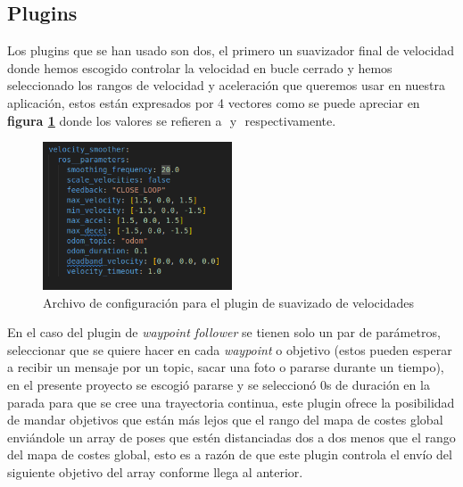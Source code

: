 \subsection{Plugins}
Los plugins que se han usado son dos, el primero un suavizador final de velocidad donde hemos escogido controlar la velocidad en bucle cerrado y 
hemos seleccionado los rangos de velocidad y aceleración que queremos usar en nuestra aplicación, estos están expresados por 4 vectores como se 
puede apreciar en \textbf{figura \ref{fig:suavizado_vel}} donde los valores se refieren a \begin{math}[\dot{X},\dot{Y},\dot{\theta_{z}}]\end{math} 
 y \begin{math}[\ddot{X}, \ddot{Y}, \ddot{\theta_{z}}] \end{math} respectivamente.

\begin{figure}[H]
    \centering
    \includegraphics[width=0.5\textwidth]{images/velocity_smoother_params.png}
    \caption{Archivo de configuración para el plugin de suavizado de velocidades}
    \label{fig:suavizado_vel}
\end{figure}

En el caso del plugin de \textit{waypoint follower} se tienen solo un par de parámetros, seleccionar que se quiere hacer en cada \textit{waypoint} o 
objetivo (estos pueden esperar a recibir un mensaje por un topic, sacar una foto o pararse durante un tiempo), en el presente proyecto se escogió pararse y se seleccionó 0s de 
duración en la parada para que se cree una trayectoria continua, este plugin ofrece la posibilidad de mandar objetivos que están más lejos que el rango del 
mapa de costes global enviándole un array de poses que estén distanciadas dos a dos menos que el rango del mapa de costes global, esto es a razón de 
que este plugin controla el envío del siguiente objetivo del array conforme llega al anterior.

